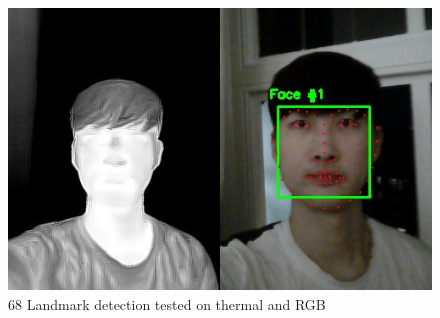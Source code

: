 \documentclass[conference]{IEEEtran}
\begin{document}
\begin{figure}[htbp]
\centerline{\includegraphics[scale = 0.45]{result.jpg}}
\caption{68 Landmark detection tested on thermal and RGB}
\label{fig}
\end{figure}
\end{document}
